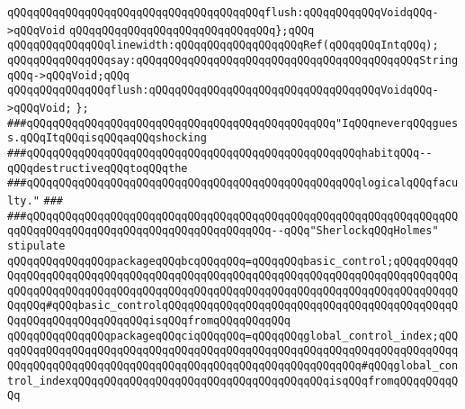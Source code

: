 \verb|qQQqqQQqqQQqqQQqqQQqqQQqqQQqqQQqqQQqqQQqflush:qQQqqQQqqQQqVoidqQQq->qQQqVoid|\newline
\verb|qQQqqQQqqQQqqQQqqQQqqQQqqQQqqQQq};qQQq|\newline
\newline
\verb|qQQqqQQqqQQqqQQqlinewidth:qQQqqQQqqQQqqQQqqQQqRef(qQQqqQQqIntqQQq);|\newline
\verb|qQQqqQQqqQQqqQQqsay:qQQqqQQqqQQqqQQqqQQqqQQqqQQqqQQqqQQqqQQqqQQqStringqQQq->qQQqVoid;qQQq|\newline
\verb|qQQqqQQqqQQqqQQqflush:qQQqqQQqqQQqqQQqqQQqqQQqqQQqqQQqqQQqVoidqQQq->qQQqVoid;|\newline
\verb|};|\newline
\newline
\newline
\verb|###qQQqqQQqqQQqqQQqqQQqqQQqqQQqqQQqqQQqqQQqqQQqqQQq"IqQQqneverqQQqguess.qQQqItqQQqisqQQqaqQQqshocking|\newline
\verb|###qQQqqQQqqQQqqQQqqQQqqQQqqQQqqQQqqQQqqQQqqQQqqQQqqQQqhabitqQQq--qQQqdestructiveqQQqtoqQQqthe|\newline
\verb|###qQQqqQQqqQQqqQQqqQQqqQQqqQQqqQQqqQQqqQQqqQQqqQQqqQQqlogicalqQQqfaculty."|\newline
\verb|###|\newline
\verb|###qQQqqQQqqQQqqQQqqQQqqQQqqQQqqQQqqQQqqQQqqQQqqQQqqQQqqQQqqQQqqQQqqQQqqQQqqQQqqQQqqQQqqQQqqQQqqQQqqQQqqQQqqQQq--qQQq"SherlockqQQqHolmes"|\newline
\newline
\newline
\verb|stipulate|\newline
\verb|qQQqqQQqqQQqqQQqpackageqQQqbcqQQqqQQq=qQQqqQQqbasic_control;qQQqqQQqqQQqqQQqqQQqqQQqqQQqqQQqqQQqqQQqqQQqqQQqqQQqqQQqqQQqqQQqqQQqqQQqqQQqqQQqqQQqqQQqqQQqqQQqqQQqqQQqqQQqqQQqqQQqqQQqqQQqqQQqqQQqqQQqqQQqqQQqqQQqqQQqqQQq#qQQqbasic_controlqQQqqQQqqQQqqQQqqQQqqQQqqQQqqQQqqQQqqQQqqQQqqQQqqQQqqQQqqQQqqQQqqQQqisqQQqfromqQQqqQQqqQQq|\newline
\verb|qQQqqQQqqQQqqQQqpackageqQQqciqQQqqQQq=qQQqqQQqglobal_control_index;qQQqqQQqqQQqqQQqqQQqqQQqqQQqqQQqqQQqqQQqqQQqqQQqqQQqqQQqqQQqqQQqqQQqqQQqqQQqqQQqqQQqqQQqqQQqqQQqqQQqqQQqqQQqqQQqqQQqqQQqqQQqqQQq#qQQqglobal_control_indexqQQqqQQqqQQqqQQqqQQqqQQqqQQqqQQqqQQqqQQqisqQQqfromqQQqqQQqqQQq|\newline
